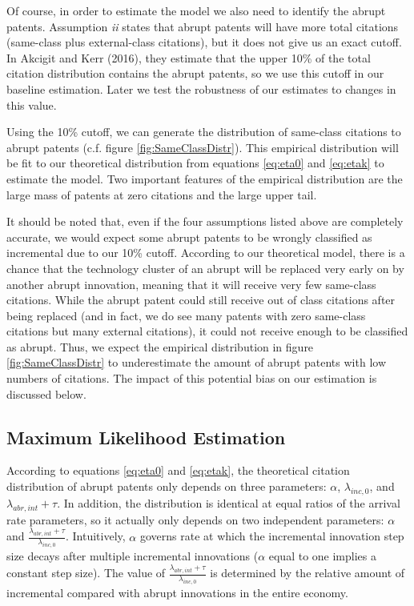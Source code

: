 \documentclass[letterpaper,12pt]{article}
\theoremstyle{definition}
\begin{document}
Of course, in order to estimate the model we also need to identify the abrupt patents. Assumption \textit{ii} states that abrupt patents will have more total citations (same-class plus external-class citations), but it does not give us an exact cutoff. In Akcigit and Kerr (2016), they estimate that the upper 10\% of the total citation distribution contains the abrupt patents, so we use this cutoff in our baseline estimation. Later we test the robustness of our estimates to changes in this value.

Using the 10\% cutoff, we can generate the distribution of same-class citations to abrupt patents (c.f. figure \ref{fig:SameClassDistr}). This empirical distribution will be fit to our theoretical distribution from equations \ref{eq:eta0} and \ref{eq:etak} to estimate the model. Two important features of the empirical distribution are the large mass of patents at zero citations and the large upper tail.

It should be noted that, even if the four assumptions listed above are completely accurate, we would expect some abrupt patents to be wrongly classified as incremental due to our 10\% cutoff. According to our theoretical model, there is a chance that the technology cluster of an abrupt will be replaced very early on by another abrupt innovation, meaning that it will receive very few same-class citations. While the abrupt patent could still receive out of class citations after being replaced (and in fact, we do see many patents with zero same-class citations but many external citations), it could not receive enough to be classified as abrupt. Thus, we expect the empirical distribution in figure \ref{fig:SameClassDistr} to underestimate the amount of abrupt patents with low numbers of citations. The impact of this potential bias on our estimation is discussed below.

\subsection{Maximum Likelihood Estimation}

According to equations \ref{eq:eta0} and \ref{eq:etak}, the theoretical citation distribution of abrupt patents only depends on three parameters: $\alpha$, $\lambda_{inc,0}$, and $\lambda_{abr, int} + \tau$. In addition, the distribution is identical at equal ratios of the arrival rate parameters, so it actually only depends on two independent parameters: $\alpha$ and $\frac{\lambda_{abr, int} + \tau}{\lambda_{inc,0}}$. Intuitively, $\alpha$ governs rate at which the incremental innovation step size decays after multiple incremental innovations ($\alpha$ equal to one implies a constant step size). The value of $\frac{\lambda_{abr, int} + \tau}{\lambda_{inc,0}}$ is determined by the relative amount of incremental compared with abrupt innovations in the entire economy.
\end{document}
